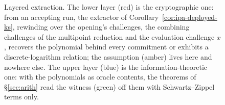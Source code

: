 \documentclass[11pt,a4paper]{article}
\theoremstyle{definition}
\begin{document}
\begin{figure}[htbp]
\caption{Layered extraction. The lower layer (red) is the cryptographic
one: from an accepting run, the extractor of
Corollary~\ref{cor:ipa-deployed-ks}, rewinding over the opening's
challenges, the combining challenges of the multipoint reduction and the
evaluation challenge $x$, recovers the polynomial behind every
commitment or exhibits a discrete-logarithm relation; the assumption
(amber) lives here and nowhere else. The upper layer (blue) is the
information-theoretic one: with the polynomials as oracle contents, the
theorems of \S\ref{sec:arith} read the witness (green) off them with
Schwartz--Zippel terms only.}
\label{fig:ks-layered}
\end{figure}
\end{document}
